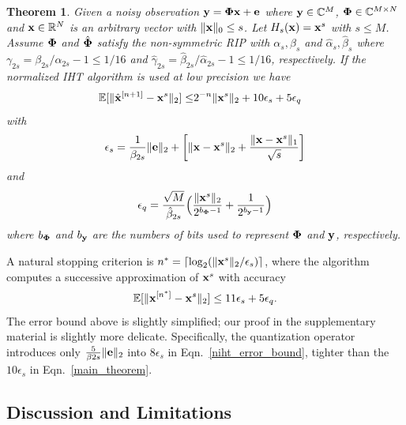 \documentclass{article}
\newtheorem{theorem}{Theorem}
\begin{document}
\begin{theorem}\label{main_theorem_TH}
Given a noisy observation ${\bf y} = {\bf \Phi x}+{\bf e} $ where ${\bf y} \in \mathbb{C}^M$, ${\bf \Phi} \in \mathbb{C}^{M\times N}$ and ${\bf x} \in \mathbb{R}^N$ is an arbitrary vector with $\|{\bf x} \|_0 \leq s$. Let $H_s({\bf x}) = {\bf x}^s$ with $s\leq M$. Assume ${\bf \Phi}$ and $\hat{\bf \Phi}$ satisfy the non-symmetric RIP with ${\alpha}_s, {\beta}_s$ and $\hat{\alpha}_s, \hat{\beta}_s$ where ${\gamma}_{2s} = {\beta}_{2s}/{\alpha}_{2s} -1 \leq 1/16$ and $\hat{\gamma}_{2s} = \hat{\beta}_{2s}/\hat{\alpha}_{2s} -1 \leq 1/16$, respectively. If the normalized IHT algorithm is used at low precision we have
\begin{equation}\label{main_theorem}
\begin{split}
        \mathbb{E}[\|\hat{{\bf x}}^{[n+1]}-{\bf x}^s\|_2]  
        \leq &2^{-n}\|{\bf x}^{s}\|_2  + 10 {\epsilon}_s + 5 {\epsilon}_q
\end{split}
\end{equation}
with 
\begin{equation}
 {\epsilon}_s = \frac{1}{\beta_{2s}}\|{\bf e} \|_2 +\bigg  [ \|{\bf x}-{\bf x}^s \|_2 + \frac{\|{\bf x}-{\bf x}^s \|_1}{\sqrt{s}}\bigg]    
\end{equation}
and
\begin{equation}
 {\epsilon}_q = \frac{\sqrt{M}}{\hat{\beta}_{2s}}\Big ( \frac{\| {\bf x}^s\|_2}{2^{b_{\bf \Phi}-1}}+\frac{1}{2^{b_{\bf y}-1}} \Big )
\end{equation}
where $b_{\bf \Phi}$ and $b_{\bf y}$ are the numbers of bits used to represent ${\bf \Phi}$ and ${\bf y}$, respectively.
\end{theorem}
A natural stopping criterion is $n^* = \lceil \log_2 (\|{\bf x}^s \|_2/\epsilon_s)\rceil$, where the algorithm computes a successive approximation of ${\bf x}^s$ with accuracy
\begin{equation}
    \mathbb{E}[\|{\bf x}^{[n^*]}-{\bf x}^s \|_2] \leq 11\epsilon_s + 5\epsilon_q.
\end{equation}
The error bound above is slightly simplified; our proof in the supplementary material is slightly more delicate. Specifically, the quantization operator introduces only $\frac{5}{\beta
{2s}} \|{\bf e} \|_2$ into $8 {\epsilon}_s$ in Eqn.~\ref{niht_error_bound}, tighter than the $10 {\epsilon}_s$ in Eqn.~\ref{main_theorem}.

\subsection{Discussion and Limitations}
\end{document}
